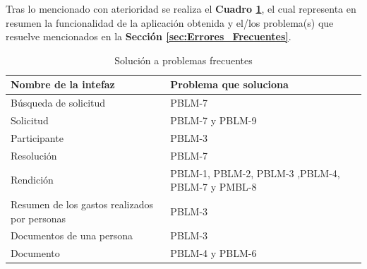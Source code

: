     \vspace{10mm}
    Tras lo mencionado con aterioridad se realiza el \textbf{Cuadro \ref{tab: Solucion_Problemas_Frecuentes}}, el cual representa en resumen la funcionalidad de la aplicación obtenida y el/los problema(s) que resuelve mencionados en la  \textbf{Sección \ref{sec:Errores_Frecuentes}}.


    \begin{table}[htbp]
        \centering
        \caption{Solución a problemas frecuentes}
        \label{tab: Solucion_Problemas_Frecuentes}
        \begin{tabular}{| p{7cm}| p{7.4cm} |}
        \hline
        \textbf{Nombre de la intefaz} & \textbf{Problema que soluciona} \\
        \hline \hline

        Búsqueda de solicitud & PBLM-7 \\ \hline

        Solicitud & PBLM-7 y PBLM-9\\ \hline

        Participante & PBLM-3 \\ \hline

        Resolución & PBLM-7 \\ \hline

        Rendición & PBLM-1, PBLM-2, PBLM-3 ,PBLM-4, PBLM-7 y PMBL-8 \\ \hline

        Resumen de los gastos realizados por personas & PBLM-3\\ \hline

        Documentos de una persona & PBLM-3\\ \hline

        Documento & PBLM-4 y PBLM-6\\ \hline
        \end{tabular}
    \end{table}
